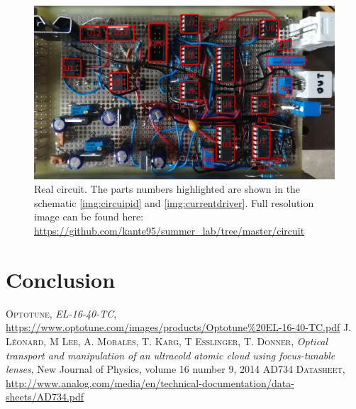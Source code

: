 \documentclass[a4paper,10pt]{article}
\begin{document}
\begin{figure}
\centering
\includegraphics[width = \textwidth]{circuit/layout}
\caption{Real circuit. The parts numbers highlighted are shown in the schematic \ref{img:circuipid} and \ref{img:currentdriver}. Full resolution image can be found here: \url{https://github.com/kante95/summer_lab/tree/master/circuit}} \label{img:layout}
\end{figure}
\section{Conclusion}

 \begin{thebibliography}{99}
 \textsc{Optotune}, \textit{EL-16-40-TC}, \url{https://www.optotune.com/images/products/Optotune%20EL-16-40-TC.pdf}
%
 \textsc{J. Léonard, M Lee, A. Morales, T. Karg, T Esslinger, T. Donner}, \textit{Optical transport and manipulation of an ultracold atomic cloud using focus-tunable lenses}, New Journal of Physics, volume 16 number 9, 2014
\textsc{AD734 Datasheet}, \url{http://www.analog.com/media/en/technical-documentation/data-sheets/AD734.pdf}
%
%
%
%
%
 \end{thebibliography}
\end{document}
